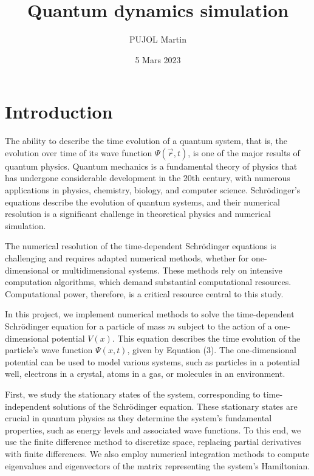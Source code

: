 \documentclass[12pt,french]{article}
\begin{document}
\title{Quantum dynamics simulation}
\author{PUJOL Martin}
\date{5 Mars 2023}

\maketitle
\tableofcontents{}

\clearpage{}

\section{Introduction}

The ability to describe the time evolution of a quantum system, that is, the evolution over time of its wave function \( \Psi(\vec{r}, t) \), is one of the major results of quantum physics. Quantum mechanics is a fundamental theory of physics that has undergone considerable development in the 20th century, with numerous applications in physics, chemistry, biology, and computer science. Schr\"odinger's equations describe the evolution of quantum systems, and their numerical resolution is a significant challenge in theoretical physics and numerical simulation.

The numerical resolution of the time-dependent Schr\"odinger equations is challenging and requires adapted numerical methods, whether for one-dimensional or multidimensional systems. These methods rely on intensive computation algorithms, which demand substantial computational resources. Computational power, therefore, is a critical resource central to this study.

In this project, we implement numerical methods to solve the time-dependent Schr\"odinger equation for a particle of mass \( m \) subject to the action of a one-dimensional potential \( V(x) \). This equation describes the time evolution of the particle's wave function \( \Psi(x,t) \), given by Equation (3). The one-dimensional potential can be used to model various systems, such as particles in a potential well, electrons in a crystal, atoms in a gas, or molecules in an environment.

First, we study the stationary states of the system, corresponding to time-independent solutions of the Schr\"odinger equation. These stationary states are crucial in quantum physics as they determine the system's fundamental properties, such as energy levels and associated wave functions. To this end, we use the finite difference method to discretize space, replacing partial derivatives with finite differences. We also employ numerical integration methods to compute eigenvalues and eigenvectors of the matrix representing the system's Hamiltonian.
\end{document}
